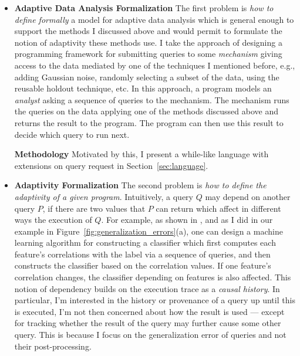 \begin{itemize}
    \item
    \textbf{Adaptive Data Analysis Formalization}
The first problem is \emph{how to define formally} a model for adaptive data analysis which is general enough to support the methods I discussed above and would permit to formulate the notion of adaptivity these methods use. 
I take the approach of designing a programming framework for submitting queries to some \emph{mechanism} giving access to the data mediated by one of the techniques I mentioned before, e.g., adding Gaussian noise, randomly selecting a subset of the data, using the reusable holdout technique, etc. 
In this approach, a program models an \emph{analyst} asking a sequence of queries to the mechanism. The mechanism runs the queries on the data applying one of the methods discussed above and returns the result to the program. The program can then use this result to decide which query to run next. 

\textbf{Methodology}
Motivated by this, I present a while-like language with extensions on query request in Section~\ref{sec:language}.

\item 
\textbf{Adaptivity Formalization}
The second problem is \emph{how to define the adaptivity of a given program}.
Intuitively, a query $Q$ may depend on another query $P$, if there are two values that $P$ can return which affect in different ways the execution of $Q$. 
For example, as shown in \cite{dwork2015reusable}, and as I did in our example in Figure~\ref{fig:generalization_errors}(a), one can design a machine learning algorithm for constructing a classifier which first computes each feature's correlations with the label via a sequence of queries, and then constructs the classifier based on the correlation values. 
If one feature's correlation changes, the classifier depending on features is also affected.  
This notion of dependency builds on the execution trace as a \emph{causal history}. 
In particular, I'm interested in the history or provenance of a query up until this is executed, I'm not then concerned about how the result is used --- except for tracking whether the result of the query may further cause some other query. 
This is because I focus on the generalization error of queries and not their post-processing. %


\end{itemize}
